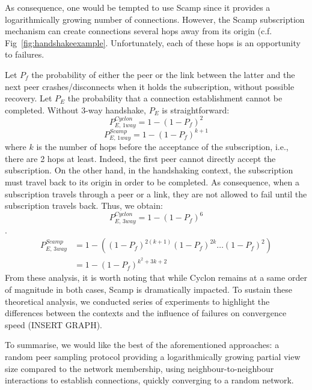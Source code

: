As consequence, one would be tempted to use Scamp since it provides a
logarithmically growing number of connections. However, the Scamp subscription
mechanism can create connections several hops away from its origin
(c.f. Fig~\ref{fig:handshakeexample}. Unfortunately, each of these hops is an
opportunity to failures.

Let $P_f$ the probability of either the peer or the link between the latter and
the next peer crashes/disconnects when it holds the subscription, without
possible recovery. Let $P_E$ the probability that a connection establishment
cannot be completed. Without 3-way handshake, $P_E$ is straightforward:
\begin{equation} P_{E,\,1way}^{Cyclon}=1-(1- P_f)^2 \end{equation}
\begin{equation} P_{E,\,1way}^{Scamp}=1-(1- P_f)^{k+1} \end{equation} where $k$
is the number of hops before the acceptance of the subscription, i.e., there
are 2 hops at least. Indeed, the first peer cannot directly accept the
subscription. On the other hand, in the handshaking context, the subscription
must travel back to its origin in order to be completed. As consequence, when a
subscription travels through a peer or a link, they are not allowed to fail
until the subscription travels back. Thus, we obtain:
\begin{equation} P_{E,\,3way}^{Cyclon}=1-(1- P_f)^6\end{equation}.
\begin{align} P_{E,\,3way}^{Scamp} &=1 - ((1-P_f)^{2(k+1)} (1-P_f)^{2k}
                                     \ldots (1-P_f)^2) \\
                                   &=1-(1-P_f)^{k^2+3k+2}
\end{align}
From these analysis, it is worth noting that while Cyclon remains at a same
order of magnitude in both cases, Scamp is dramatically impacted. To sustain
these theoretical analysis, we conducted series of experiments to highlight the
differences between the contexts and the influence of failures on convergence
speed (INSERT GRAPH).

To summarise, we would like the best of the aforementioned approaches: a random
peer sampling protocol providing a logarithmically growing partial view size
compared to the network membership, using neighbour-to-neighbour interactions
to establish connections, quickly converging to a random network.

